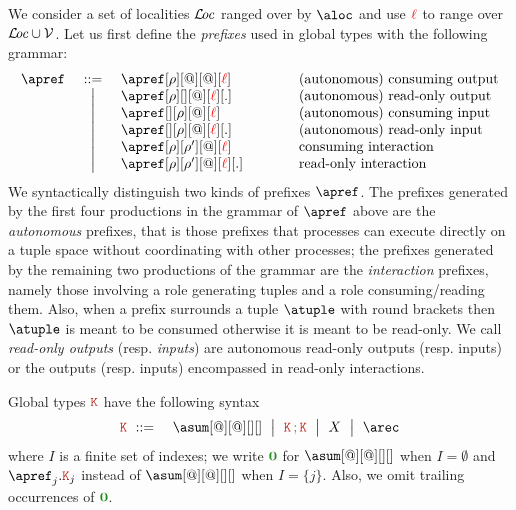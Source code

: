 We consider a set of localities $\mathcal{L}\!\mathit{oc}$ ranged over by $\aloc$ and
use ${\color{red}\ell}$ to range over $\mathcal{L}\!\mathit{oc}\cup\mathcal{V}$.
%
Let us first define the \emph{prefixes} used in global types
with the following grammar:
%
\[\begin{array}{lcl@{\qquad\qquad}l}
  \apref & \bnfdef
  & \apref[\arole][@][@][\alocvar] & \text{(autonomous) consuming output}
  \\ & \bnfmid
  & \apref[\arole][{}][@][\alocvar][.] & \text{(autonomous) read-only output}
  \\ & \bnfmid
  & \apref[{}][\arole][@][\alocvar] & \text{(autonomous) consuming input}
  \\ & \bnfmid
  & \apref[{}][\arole][@][\alocvar][.] & \text{(autonomous) read-only input}
  \\ & \bnfmid
  & \apref[\arole][\arole'][@][\alocvar] & \text{consuming interaction}
  \\ & \bnfmid
  & \apref[\arole][\arole'][@][\alocvar][.]  & \text{read-only interaction}
  \end{array}
\]
%
We syntactically distinguish two kinds of prefixes $\apref$.
%
The prefixes generated by the first four productions in the grammar of
$\apref$ above are the \emph{autonomous} prefixes, that is those
prefixes that processes can execute directly on a tuple space without
coordinating with other processes; the prefixes generated by the
remaining two productions of the grammar are the \emph{interaction}
prefixes, namely those involving a role generating tuples and a role
consuming/reading them.
%
Also, when a prefix surrounds a tuple $\atuple$ with round brackets
then $\atuple$ is meant to be consumed otherwise it is meant to be
read-only.
%
We call \emph{read-only outputs} (resp. \emph{inputs}) are autonomous
read-only outputs (resp. inputs) or the outputs (resp. inputs)
encompassed in read-only interactions.

Global types $\aK$ have the following syntax
\begin{eqnarray*}
  \aK & \bnfdef & \asum[@][@][][]
                  \bnfmid
                  \aK \seqop \aK \bnfmid
                  X \bnfmid
                  \arec
\end{eqnarray*}
where $I$ is a finite set of indexes; we write $\nil$ for
$\asum[@][@][][]$ when $I = \emptyset$ and $\apref_j.\aK_j$ instead of
$\asum[@][@][][]$ when $I = \{j\}$.
%
Also, we omit trailing occurrences of $\nil$.

